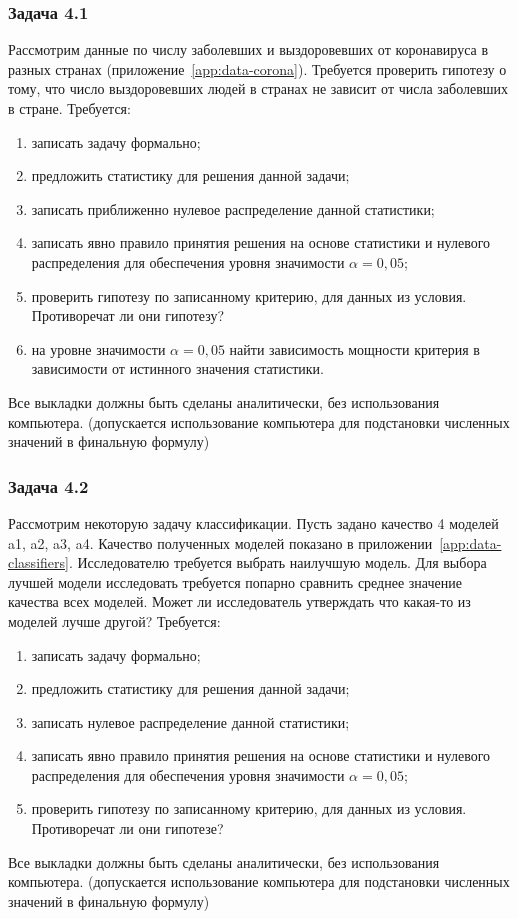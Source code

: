 \subsubsection{Задача 4.1}

Рассмотрим данные по числу заболевших и выздоровевших от коронавируса в разных странах (приложение~\ref{app:data-corona}). Требуется проверить гипотезу о тому, что число выздоровевших
людей в странах не зависит от числа заболевших в стране. 
Требуется:
\begin{enumerate}
    \item записать задачу формально;
    \item предложить статистику для решения данной задачи;
    \item записать приближенно нулевое распределение данной статистики;
    \item записать явно правило принятия решения на основе статистики и нулевого распределения для обеспечения уровня значимости $\alpha=0{,}05$;
    \item проверить гипотезу по записанному критерию, для данных из условия. Противоречат ли они гипотезу?
    \item на уровне значимости $\alpha=0{,}05$ найти зависимость мощности критерия в зависимости от истинного значения статистики.
\end{enumerate}
Все выкладки должны быть сделаны аналитически, без использования компьютера. (допускается использование компьютера для подстановки численных значений в финальную формулу)

\subsubsection{Задача 4.2}

Рассмотрим некоторую задачу классификации. Пусть задано качество 4 моделей a1, a2, a3, a4.
Качество полученных моделей показано в приложении~\ref{app:data-classifiers}. 
Исследователю требуется выбрать наилучшую модель. Для выбора лучшей модели исследовать
требуется попарно сравнить среднее значение качества всех моделей. Может ли исследователь утверждать что какая-то из моделей лучше другой?
Требуется:
\begin{enumerate}
    \item записать задачу формально;
    \item предложить статистику для решения данной задачи;
    \item записать нулевое распределение данной статистики;
    \item записать явно правило принятия решения на основе статистики и нулевого распределения для обеспечения уровня значимости $\alpha=0{,}05$;
    \item проверить гипотезу по записанному критерию, для данных из условия. Противоречат ли они гипотезе?
\end{enumerate}
Все выкладки должны быть сделаны аналитически, без использования компьютера. (допускается использование компьютера для подстановки численных значений в финальную формулу)

